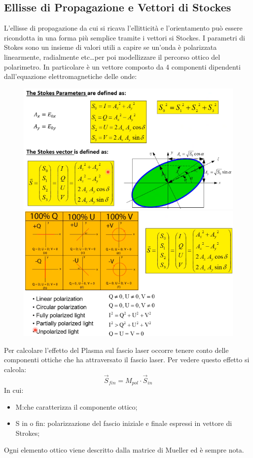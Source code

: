 \documentclass{article}
\begin{document}
\subsection{Ellisse di Propagazione e Vettori di Stockes}
L'ellisse di propagazione da cui si ricava l'ellitticità e l'orientamento può essere ricondotta in una forma più semplice tramite i vettori si Stockes. I parametri di Stokes sono un insieme di valori utili a capire se un'onda è polarizzata linearmente, radialmente etc\dots per poi modellizzare il percorso ottico del polarimetro.\newline
In particolare è un vettore composto da 4 componenti dipendenti dall'equazione elettromagnetiche delle onde:\newpage
\begin{figure}[t]
    \centering
    \includegraphics[scale=0.4]{2022-05-24-23-36-23.png}%
    \includegraphics[scale=0.4]{2022-05-24-23-38-37.png}%
\end{figure}
Per calcolare l'effetto del Plasma sul fascio laser occorre tenere conto delle componenti ottiche che ha attraversato il fascio laser. Per vedere questo effetto si calcola:
\begin{equation}
    \overrightarrow{S}_{fin}=M_{pol}\cdot \overrightarrow{S}_{in}
\end{equation}
In cui:\begin{itemize}
    \item M:\@matrice che caratterizza il componente ottico;
    \item S in o fin: polarizzazione del fascio iniziale e finale espressi in vettore di Strokes;
\end{itemize}
Ogni elemento ottico viene descritto dalla matrice di Mueller ed è sempre nota.
\end{document}
